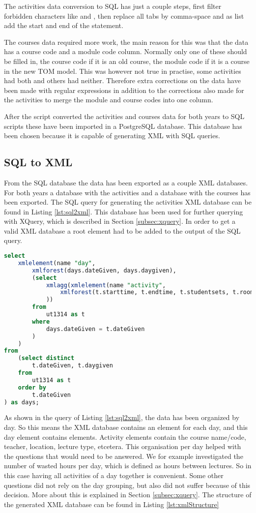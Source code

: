 The activities data conversion to SQL has just a couple steps, first filter forbidden characters like  and , then replace all tabs by comma-space and as list add the start and end of the  statement.

The courses data required more work, the main reason for this was that the data has a course code and a module code column. Normally only one of these should be filled in, the course code if it is an old course, the module code if it is a course in the new TOM model. This was however not true in practise, some activities had both and others had neither. Therefore extra corrections on the data have been made with regular expressions in addition to the corrections also made for the activities to merge the module and course codes into one column.

After the script converted the activities and courses data for both years to SQL scripts these have been imported in a PostgreSQL database. This database has been chosen because it is capable of generating XML with SQL queries.

\subsection{SQL to XML} \label{subsec:sql2xml}
From the SQL database the data has been exported as a couple XML databases. For both years a database with the activities and a database with the courses has been exported. The SQL query for generating the activities XML database can be found in Listing \ref{lst:sql2xml}. This database has been used for further querying with XQuery, which is described in Section \ref{subsec:xquery}. In order to get a valid XML database a root element had to be added to the output of the SQL query.

\begin{lstlisting}[caption=SQL to XML conversion, label=lst:sql2xml, float=htpb, language=sql]
select
	xmlelement(name "day",
		xmlforest(days.dateGiven, days.daygiven),
		(select
			xmlagg(xmlelement(name "activity",
				xmlforest(t.starttime, t.endtime, t.studentsets, t.room, t.coursename, t.teacher)
			))
		from
			ut1314 as t
		where
			days.dateGiven = t.dateGiven
		)
	)
from
	(select distinct
		t.dateGiven, t.daygiven
	from
		ut1314 as t
	order by
		t.dateGiven
) as days;
\end{lstlisting}

As shown in the query of Listing \ref{lst:sql2xml}, the data has been organized by day. So this means the XML database contains an element for each day, and this day element contains  elements. Activity elements contain the course name/code, teacher, location, lecture type, etcetera. This organisation per day helped with the questions that would need to be answered. We for example investigated the number of wasted hours per day, which is defined as hours between lectures. So in this case having all activities of a day together is convenient. Some other questions did not rely on the day grouping, but also did not suffer because of this decision. More about this is explained in Section \ref{subsec:xquery}. The structure of the generated XML database can be found in Listing \ref{lst:xmlStructure}

